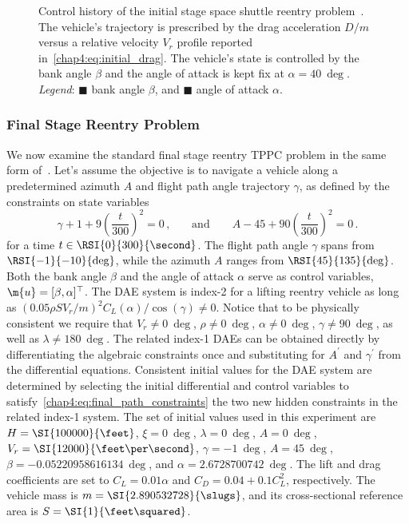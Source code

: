 \begin{figure}[htb]
  \centering
  \small{}
  \caption{Control history of the initial stage space shuttle reentry problem~\cite{brenan1995numerical}. The vehicle's trajectory is prescribed by the drag acceleration $D/m$ versus a relative velocity $V_r$ profile reported in~\eqref{chap4:eq:initial_drag}. The vehicle's state is controlled by the bank angle $\beta$ and the angle of attack is kept fix at $\alpha = \SI{40}{\deg}$. \emph{Legend}: \textcolor{mycolor1}{$\blacksquare$} bank angle $\beta$, and \textcolor{mycolor2}{$\blacksquare$} angle of attack $\alpha$.}
  \label{chap4:fig:tppc_initial}
\end{figure}

\subsubsection{Final Stage Reentry Problem}

We now examine the standard final stage reentry \ac{TPPC} problem in the same form of~\cite{brenan1995numerical}. Let's assume the objective is to navigate a vehicle along a predetermined azimuth $A$ and flight path angle trajectory $\gamma$, as defined by the constraints on state variables
%
\begin{equation}
  \gamma + 1 + 9\left(\dfrac{t}{300}\right)^2 = 0 \, \text{,}
  \qquad \text{and} \qquad
  A - 45 + 90\left(\dfrac{t}{300}\right)^2 = 0 \, \text{.}
  \label{chap4:eq:final_path_constraints}
\end{equation}
%
for a time $t \in \RSI{0}{300}{\second}$. The flight path angle $\gamma$ spans from $\RSI{-1}{-10}{\deg}$, while the azimuth $A$ ranges from $\RSI{45}{135}{\deg}$. Both the bank angle $\beta$ and the angle of attack $\alpha$ serve as control variables, \ie{} $\m{u} = [\beta, \alpha]^\top$. The \ac{DAE} system is index-2 for a lifting reentry vehicle as long as $(0.05 \rho S V_r/m)^2 C_L(\alpha)/\cos(\gamma) \neq 0$. Notice that to be physically consistent we require that $V_r \neq \SI{0}{\deg}$, $\rho\neq \SI{0}{\deg}$, $\alpha \neq \SI{0}{\deg}$, $\gamma \neq \SI{90}{\deg}$, as well as $\lambda \neq \SI{180}{\deg}$. The related index-1 \acp{DAE} can be obtained directly by differentiating the algebraic constraints once and substituting for $A^\prime$ and $\gamma^\prime$ from the differential equations. Consistent initial values for the \ac{DAE} system are determined by selecting the initial differential and control variables to satisfy~\eqref{chap4:eq:final_path_constraints} the two new hidden constraints in the related index-1 system. The set of initial values used in this experiment are $H = \SI{100000}{\feet}$, $\xi = \SI{0}{\deg}$, $\lambda = \SI{0}{\deg}$, $A = \SI{0}{\deg}$, $V_r = \SI{12000}{\feet\per\second}$, $\gamma = \SI{-1}{\deg}$, $A = \SI{45}{\deg}$, $\beta = \SI{-0.05220958616134}{\deg}$, and $\alpha = \SI{2.6728700742}{\deg}$. The lift and drag coefficients are set to $C_L = 0.01\alpha$ and $C_D = 0.04 + 0.1C_L^2$, respectively. The vehicle mass is $m = \SI{2.890532728}{\slugs}$, and its cross-sectional reference area is $S = \SI{1}{\feet\squared}$.

